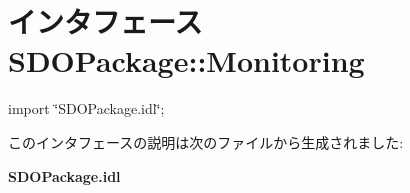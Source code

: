 \section{インタフェース SDOPackage::Monitoring}
\label{interfaceSDOPackage_1_1Monitoring}


{\ttfamily import \char`\"{}SDOPackage.idl\char`\"{};}



このインタフェースの説明は次のファイルから生成されました:\begin{DoxyCompactItemize}
\item 
{\bf SDOPackage.idl}\end{DoxyCompactItemize}
